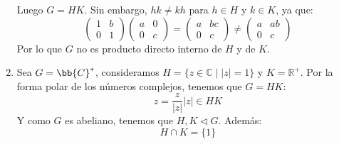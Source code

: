 \begin{ejemplo}
\begin{enumerate}
            Luego $G = HK$. Sin embargo, $hk \neq kh$ para $h\in H$ y $k\in K$, ya que:
            \begin{equation*}
                \left(\begin{array}{cc}
                    1 & b \\
                    0 & 1 
                \end{array}\right) \left(\begin{array}{cc}
                    a & 0 \\
                    0 &  c
                \end{array}\right) = \left(\begin{array}{cc}
                    a & bc \\
                    0 & c 
                \end{array}\right) \neq \left(\begin{array}{cc}
                    a & ab \\
                    0 & c 
                \end{array}\right)
            \end{equation*}
            Por lo que $G$ no es producto directo interno de $H$ y de $K$.
        \item Sea $G = \bb{C}^\ast$, consideramos $H = \{z\in \mathbb{C} \mid |z| = 1\}$ y $K = \mathbb{R}^+$. Por la forma polar de los números complejos, tenemos que $G = HK$:
            \begin{equation*}
                z = \dfrac{z}{|z|}|z| \in HK
            \end{equation*}
            Y como $G$ es abeliano, tenemos que $H,K\lhd G$. Además:
            \begin{equation*}
                H\cap K =\{1\}
            \end{equation*}
    \end{enumerate}
\end{ejemplo}

